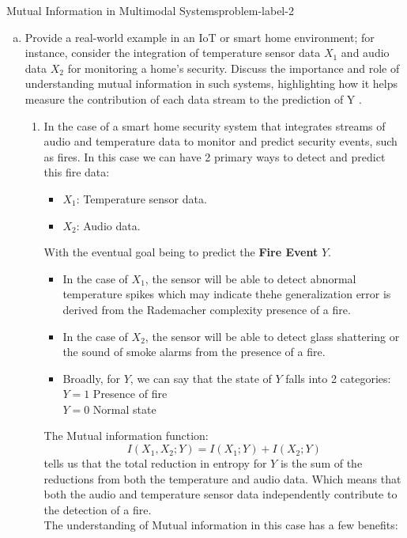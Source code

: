 	\begin{problem}{Mutual Information in Multimodal Systems}{problem-label-2}
		
		\begin{enumerate}[(a)]
			\item
			Provide a real-world example in an IoT or smart home environment; for instance, consider the integration of temperature sensor data \(X_1\) and audio data \(X_2\) for monitoring a home’s security. Discuss the importance and role of understanding mutual information in such systems, highlighting how it helps measure the contribution of each data stream to the prediction of Y . 
			\begin{enumerate}[label = (\roman*)]
				\item In the case of a smart home security system that integrates streams of audio and temperature data to monitor and predict security events, such as fires. In this case we can have 2 primary ways to detect and predict this fire data:
				\begin{itemize}
					\item $X_1$: Temperature sensor data.
					\item $X_2$: Audio data.
				\end{itemize}
				With the eventual goal being to predict the \textbf{Fire Event} $Y$.
				\begin{itemize}
					\item In the case of $X_1$, the sensor will be able to detect abnormal temperature spikes which may indicate thehe generalization error is derived from the Rademacher complexity   presence of a fire.
					\item In the case of $X_2$, the sensor will be able to detect glass shattering or the sound of smoke alarms from the presence of a fire.
					\item Broadly, for $Y$, we can say that the state of $Y$ falls into 2 categories: \\
					$Y = 1$ Presence of fire \\
					$Y = 0$ Normal state\\
				 \end{itemize}
				 The Mutual information function: \[ I(X_1, X_2; Y) = I(X_1; Y) + I(X_2; Y) \]  tells us that the total reduction in entropy for $Y$ is the sum of the reductions from both the temperature and audio data. Which means that both the audio and temperature sensor data independently contribute to the detection of a fire.\\
				 The understanding of Mutual information in this case has a few benefits:

\end{enumerate}
\end{enumerate}
\end{problem}

